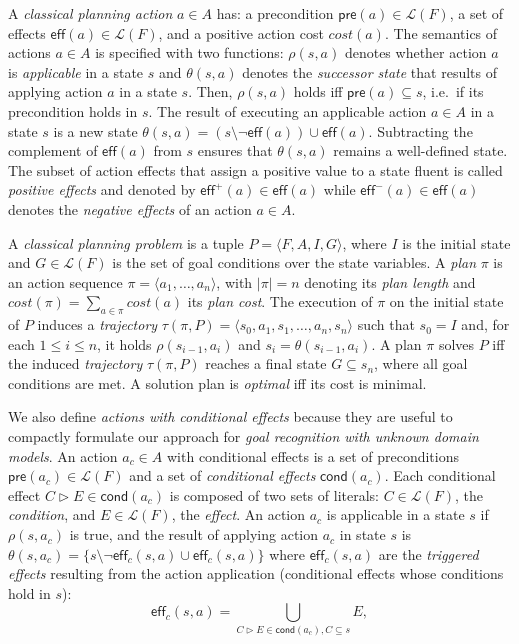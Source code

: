 \documentclass{article}
\newcommand{\tup}[1]{{\langle #1 \rangle}}
\newcommand{\pre}{\mathsf{pre}}     %
\newcommand{\eff}{\mathsf{eff}}     %
\newcommand{\cond}{\mathsf{cond}}   %
\begin{document}
A {\em classical planning action} $a\in A$ has: a precondition $\pre(a)\in\mathcal{L}(F)$, a set of effects $\eff(a)\in\mathcal{L}(F)$, and a positive action cost $cost(a)$. The semantics of actions $a\in A$ is specified with two functions: $\rho(s,a)$ denotes whether action $a$ is {\em applicable} in a state $s$ and $\theta(s,a)$ denotes the {\em successor state} that results of applying action $a$ in a state $s$. Then, $\rho(s,a)$ holds iff $\pre(a)\subseteq s$, i.e.~if its precondition holds in $s$. The result of executing an applicable action $a\in A$ in a state $s$ is a new state $\theta(s,a)=(s\setminus \neg\eff(a))\cup\eff(a)$. Subtracting the complement of $\eff(a)$ from $s$ ensures that $\theta(s,a)$ remains a well-defined state. The subset of action effects that assign a positive value to a state fluent is called {\em positive effects} and denoted by $\eff^+(a)\in \eff(a)$ while $\eff^-(a)\in \eff(a)$ denotes the {\em negative effects} of an action $a\in A$.

A {\em classical planning problem} is a tuple $P=\tup{F,A,I,G}$, where $I$ is the initial state and $G\in\mathcal{L}(F)$ is the set of goal conditions over the state variables. A {\em plan} $\pi$ is an action sequence $\pi=\tup{a_1, \ldots, a_n}$, with $|\pi|=n$ denoting its {\em plan length} and $cost(\pi)=\sum_{a\in\pi} cost(a)$ its {\em plan cost}. The execution of $\pi$ on the initial state of $P$ induces a {\em trajectory} $\tau(\pi,P)=\tup{s_0, a_1, s_1, \ldots, a_n, s_n}$ such that $s_0=I$ and, for each {\small $1\leq i\leq n$}, it holds $\rho(s_{i-1},a_i)$ and $s_i=\theta(s_{i-1},a_i)$. A plan $\pi$ solves $P$ iff the induced {\em trajectory} $\tau(\pi,P)$ reaches a final state $G \subseteq s_n$, where all goal conditions are met. A solution plan is {\em optimal} iff its cost is minimal.

We also define {\em actions with conditional effects} because they are useful to compactly formulate our approach for {\em goal recognition with unknown domain models}. An action $a_c\in A$ with conditional effects is a set of preconditions $\pre(a_c)\in\mathcal{L}(F)$ and a set of {\em conditional effects} $\cond(a_c)$. Each conditional effect $C\rhd E\in\cond(a_c)$ is composed of two sets of literals: $C\in\mathcal{L}(F)$, the {\em condition}, and $E\in\mathcal{L}(F)$, the {\em effect}. An action $a_c$ is applicable in a state $s$ if $\rho(s,a_c)$ is true, and the result of applying action $a_c$ in state $s$ is $\theta(s,a_c)=\{s\setminus\neg\eff_c(s,a)\cup\eff_c(s,a)\}$ where $\eff_c(s,a)$ are the {\em triggered effects} resulting from the action application (conditional effects whose conditions hold in $s$):
\[
\eff_c(s,a)=\bigcup_{C\rhd E\in\cond(a_c),C\subseteq s} E,
\]
\end{document}
